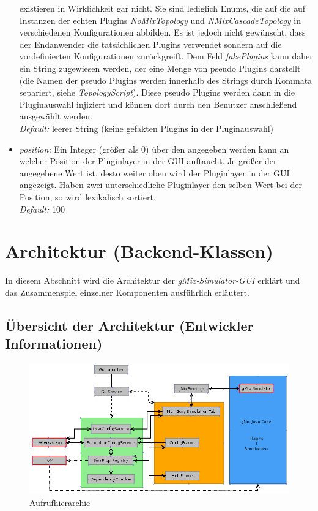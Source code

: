 \documentclass[a4paper, 11pt]{article} %
\begin{document}
\begin{itemize}
\begin{itemize}
	\end{itemize}
	existieren in Wirklichkeit gar nicht. Sie sind lediglich Enums, die auf die auf Instanzen der echten Plugins \emph{NoMixTopology} und \emph{NMixCascadeTopology} in verschiedenen Konfigurationen abbilden. Es ist jedoch nicht gewünscht, dass der Endanwender die tatsächlichen Plugins verwendet sondern auf die vordefinierten Konfigurationen zurückgreift. Dem Feld \emph{fakePlugins} kann daher ein String zugewiesen werden, der eine Menge von pseudo Plugins darstellt (die Namen der pseudo Plugins werden innerhalb des Strings durch Kommata separiert, siehe \emph{TopologyScript}). Diese pseudo Plugins werden dann in die Pluginauswahl injiziert und können dort durch den Benutzer anschließend ausgewählt werden.\\
	\emph{Default:} leerer String (keine gefakten Plugins in der Pluginauswahl)
	\item \emph{position:}
	Ein Integer (größer als 0) über den angegeben werden kann an welcher Position der Pluginlayer in der GUI auftaucht. Je größer der angegebene Wert ist, desto weiter oben wird der Pluginlayer in der GUI angezeigt. Haben zwei unterschiedliche Pluginlayer den selben Wert bei der Position, so wird lexikalisch sortiert.\\
	\emph{Default:} 100 
\end{itemize}

\section{Architektur (Backend-Klassen)} %
\label{sec:architektur}
In diesem Abschnitt wird die Architektur der \emph{gMix-Simulator-GUI} erklärt und das Zusammenspiel einzelner Komponenten ausführlich erläutert. 

\subsection{Übersicht der Architektur (Entwickler Informationen)} %
\label{ssub:uebersicht}

\begin{figure}[!htp]
\includegraphics[width=\textwidth]{img/arch.png}
\caption{Aufrufhierarchie}
\label{fig:callgraph}
\end{figure}
\end{document}
